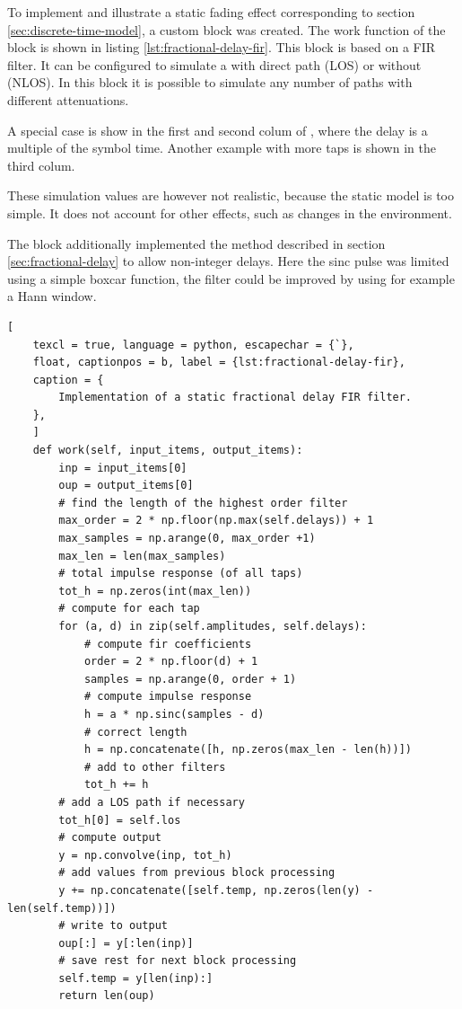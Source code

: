  To implement and illustrate a static fading effect corresponding to section \ref{sec:discrete-time-model}, a custom block was created. The work function of the block is shown in listing \ref{lst:fractional-delay-fir}. This block is based on a FIR filter. It can be configured to simulate a with direct path (LOS) or without (NLOS).
 In this block it is possible to simulate any number of paths with different attenuations.

A special case is show in the first and second colum of , where the delay is  a multiple of the symbol time. Another example with more taps is shown in the third colum.

These simulation values are however not realistic, because the static model is too simple. It does not account for other effects, such as changes in the environment. 

The block  additionally implemented the method described in section \ref{sec:fractional-delay} to allow non-integer delays. 
Here the sinc pulse was limited using a simple boxcar function, the filter could be improved by using for example a Hann window.


\begin{lstlisting}[
	texcl = true, language = python, escapechar = {`},
	float, captionpos = b, label = {lst:fractional-delay-fir},
	caption = {
		Implementation of a static fractional delay FIR filter.
	},
	]
	def work(self, input_items, output_items):
		inp = input_items[0]
		oup = output_items[0]
		# find the length of the highest order filter
		max_order = 2 * np.floor(np.max(self.delays)) + 1
		max_samples = np.arange(0, max_order +1)
		max_len = len(max_samples)
		# total impulse response (of all taps)
		tot_h = np.zeros(int(max_len))
		# compute for each tap
		for (a, d) in zip(self.amplitudes, self.delays):
			# compute fir coefficients
			order = 2 * np.floor(d) + 1
			samples = np.arange(0, order + 1)
			# compute impulse response
			h = a * np.sinc(samples - d)
			# correct length
			h = np.concatenate([h, np.zeros(max_len - len(h))])
			# add to other filters
			tot_h += h
		# add a LOS path if necessary
		tot_h[0] = self.los
		# compute output
		y = np.convolve(inp, tot_h)
		# add values from previous block processing
		y += np.concatenate([self.temp, np.zeros(len(y) - len(self.temp))])
		# write to output
		oup[:] = y[:len(inp)]
		# save rest for next block processing
		self.temp = y[len(inp):]
		return len(oup)
	
\end{lstlisting}

